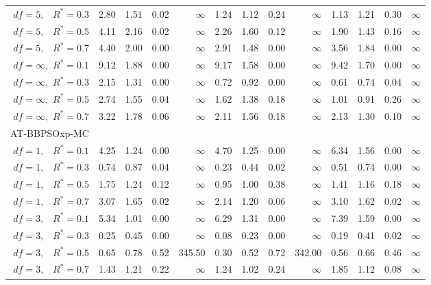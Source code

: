 \documentclass[12pt]{article}
\begin{document}
\begin{table}[ht]
{\begin{tabular}{r|rrrr|rrrr|rrrr}
  $df = 5,\enspace$ $R^* =0.3$ & 2.80 & 1.51 & 0.02 & $\infty$ & 1.24 & 1.12 & 0.24 & $\infty$ & 1.13 & 1.21 & 0.30 & $\infty$ \\ 
  $df = 5,\enspace$ $R^* =0.5$ & 4.11 & 2.16 & 0.02 & $\infty$ & 2.26 & 1.60 & 0.12 & $\infty$ & 1.90 & 1.43 & 0.16 & $\infty$ \\ 
  $df = 5,\enspace$ $R^* =0.7$ & 4.40 & 2.00 & 0.00 & $\infty$ & 2.91 & 1.48 & 0.00 & $\infty$ & 3.56 & 1.84 & 0.00 & $\infty$ \\ 
  $df = \infty,$ $R^* =0.1$ & 9.12 & 1.88 & 0.00 & $\infty$ & 9.17 & 1.58 & 0.00 & $\infty$ & 9.42 & 1.70 & 0.00 & $\infty$ \\ 
  $df = \infty,$ $R^* =0.3$ & 2.15 & 1.31 & 0.00 & $\infty$ & 0.72 & 0.92 & 0.00 & $\infty$ & 0.61 & 0.74 & 0.04 & $\infty$ \\ 
  $df = \infty,$ $R^* =0.5$ & 2.74 & 1.55 & 0.04 & $\infty$ & 1.62 & 1.38 & 0.18 & $\infty$ & 1.01 & 0.91 & 0.26 & $\infty$ \\ 
  $df = \infty,$ $R^* =0.7$ & 3.22 & 1.78 & 0.06 & $\infty$ & 2.11 & 1.56 & 0.18 & $\infty$ & 2.13 & 1.30 & 0.10 & $\infty$ \\ 
\hline
\multicolumn{1}{l|}{AT-BBPSOxp-MC} &&&&&&&&&&&&\\
  $df = 1,\enspace$ $R^* =0.1$ & 4.25 & 1.24 & 0.00 & $\infty$ & 4.70 & 1.25 & 0.00 & $\infty$ & 6.34 & 1.56 & 0.00 & $\infty$ \\ 
  $df = 1,\enspace$ $R^* =0.3$ & 0.74 & 0.87 & 0.04 & $\infty$ & 0.23 & 0.44 & 0.02 & $\infty$ & 0.51 & 0.74 & 0.00 & $\infty$ \\ 
  $df = 1,\enspace$ $R^* =0.5$ & 1.75 & 1.24 & 0.12 & $\infty$ & 0.95 & 1.00 & 0.38 & $\infty$ & 1.41 & 1.16 & 0.18 & $\infty$ \\ 
  $df = 1,\enspace$ $R^* =0.7$ & 3.07 & 1.65 & 0.02 & $\infty$ & 2.14 & 1.20 & 0.06 & $\infty$ & 3.10 & 1.62 & 0.02 & $\infty$ \\ 
  $df = 3,\enspace$ $R^* =0.1$ & 5.34 & 1.01 & 0.00 & $\infty$ & 6.29 & 1.31 & 0.00 & $\infty$ & 7.39 & 1.59 & 0.00 & $\infty$ \\ 
  $df = 3,\enspace$ $R^* =0.3$ & 0.25 & 0.45 & 0.00 & $\infty$ & 0.08 & 0.23 & 0.00 & $\infty$ & 0.19 & 0.41 & 0.02 & $\infty$ \\ 
  $df = 3,\enspace$ $R^* =0.5$ & 0.65 & 0.78 & 0.52 & 345.50 & 0.30 & 0.52 & 0.72 & 342.00 & 0.56 & 0.66 & 0.46 & $\infty$ \\ 
  $df = 3,\enspace$ $R^* =0.7$ & 1.43 & 1.21 & 0.22 & $\infty$ & 1.24 & 1.02 & 0.24 & $\infty$ & 1.85 & 1.12 & 0.08 & $\infty$ \\ 

\end{tabular}}
\end{table}
\end{document}
